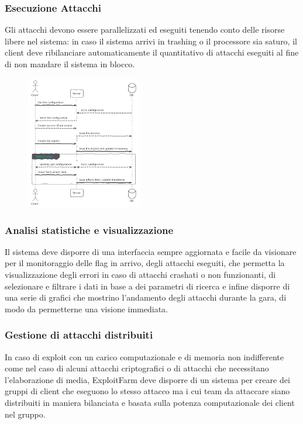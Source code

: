 \documentclass[11pt]{article}
\begin{document}
\subsubsection{Esecuzione Attacchi}
Gli attacchi devono essere parallelizzati ed eseguiti tenendo conto delle risorse libere nel sistema: in caso il sistema arrivi in trashing o il processore sia saturo, il client deve ribilanciare automaticamente il quantitativo di attacchi eseguiti al fine di non mandare il sistema in blocco.
	\begin{figure}[H]
		\centering
		\includegraphics[width=0.45\textwidth]{attack_sequence.png}
	\end{figure}
\subsubsection{Analisi statistiche e visualizzazione}
Il sistema deve disporre di una interfaccia sempre aggiornata e facile da visionare per il monitoraggio delle flag in arrivo, degli attacchi eseguiti, che permetta la visualizzazione degli errori in caso di attacchi crashati o non funzionanti, di selezionare e filtrare i dati in base a dei parametri di ricerca e infine disporre di una serie di grafici che mostrino l'andamento degli attacchi durante la gara, di modo da permetterne una visione immediata.
\subsubsection{Gestione di attacchi distribuiti}
In caso di exploit con un carico computazionale e di memoria non indifferente come nel caso di alcuni attacchi criptografici o di attacchi che necessitano l'elaborazione di media, ExploitFarm deve disporre di un sistema per creare dei gruppi di client che eseguono lo stesso attacco ma i cui team da attaccare siano distribuiti in maniera bilanciata e basata sulla potenza computazionale dei client nel gruppo.
\end{document}
